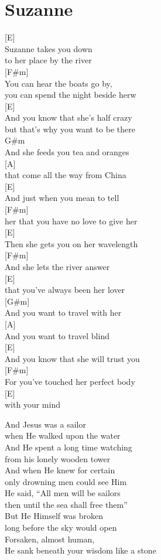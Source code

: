 \documentclass[
  letterpaper,
  DIV=11,
  numbers=noendperiod]{scrreprt}
\begin{document}
\hypertarget{suzanne}{%
\chapter{Suzanne}\label{suzanne}}

{[}E{]}\\
Suzanne takes you down\\
to her place by the river\\
{[}F\#m{]}\\
You can hear the boats go by,\\
you can spend the night beside herw\\
{[}E{]}\\
And you know that she's half crazy\\
but that's why you want to be there\\
G\#m\\
And she feeds you tea and oranges\\
{[}A{]}\\
that come all the way from China\\
{[}E{]}\\
And just when you mean to tell\\
{[}F\#m{]}\\
her that you have no love to give her\\
{[}E{]}\\
Then she gets you on her wavelength\\
{[}F\#m{]}\\
And she lets the river answer\\
{[}E{]}\\
that you've always been her lover\\
{[}G\#m{]}\\
And you want to travel with her\\
{[}A{]}\\
And you want to travel blind\\
{[}E{]}\\
And you know that she will trust you\\
{[}F\#m{]}\\
For you've touched her perfect body\\
{[}E{]}\\
with your mind

And Jesus was a sailor\\
when He walked upon the water\\
And He spent a long time watching\\
from his lonely wooden tower\\
And when He knew for certain\\
only drowning men could see Him\\
He said, ``All men will be sailors\\
then until the sea shall free them''\\
But He Himself was broken\\
long before the sky would open\\
Forsaken, almost human,\\
He sank beneath your wisdom like a stone
\end{document}
